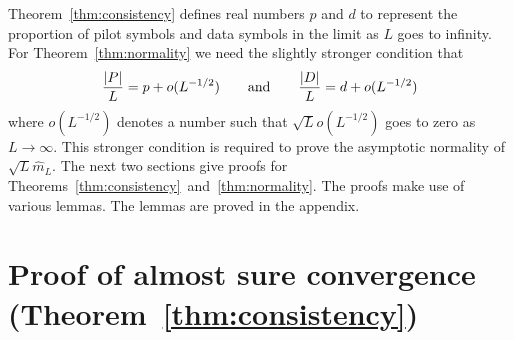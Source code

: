 \documentclass[journal]{IEEEtran}
\begin{document}
Theorem~\ref{thm:consistency} defines real numbers $p$ and $d$ to represent the proportion of pilot symbols and data symbols in the limit as $L$ goes to infinity.  For Theorem~\ref{thm:normality} we need the slightly stronger condition that 
\[
\frac{{\left\vert P \right\vert}}{L} = p + o(L^{-1/2}) \qquad \text{and} \qquad \frac{{\left\vert D \right\vert}}{L} = d + o(L^{-1/2})
\] 
where $o(L^{-1/2})$ denotes a number such that $\sqrt{L} o(L^{-1/2})$ goes to zero as $L\rightarrow \infty$.  This stronger condition is required to prove the asymptotic normality of $\sqrt{L}\hat{m}_L$.  The next two sections give proofs for Theorems~\ref{thm:consistency}~and~\ref{thm:normality}.  The proofs make use of various lemmas.  The lemmas are proved in the appendix.




\section{Proof of almost sure convergence (Theorem~\ref{thm:consistency}) } \label{sec:proof-almost-sure}
\end{document}
